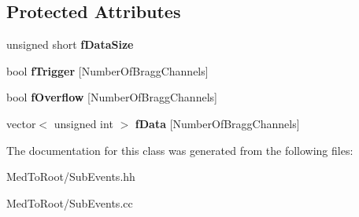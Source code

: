 \subsection*{Protected Attributes}
\begin{DoxyCompactItemize}
\item 
\hypertarget{class_bragg_chamber_sub_event_aa5205f96a716ea517af677c074367d9a}{unsigned short {\bfseries f\-Data\-Size}}\label{class_bragg_chamber_sub_event_aa5205f96a716ea517af677c074367d9a}

\item 
\hypertarget{class_bragg_chamber_sub_event_ac33e87b9327b80f85032de6076f1986e}{bool {\bfseries f\-Trigger} \mbox{[}Number\-Of\-Bragg\-Channels\mbox{]}}\label{class_bragg_chamber_sub_event_ac33e87b9327b80f85032de6076f1986e}

\item 
\hypertarget{class_bragg_chamber_sub_event_a59f31e1a784e52768d19bfd98dae16f0}{bool {\bfseries f\-Overflow} \mbox{[}Number\-Of\-Bragg\-Channels\mbox{]}}\label{class_bragg_chamber_sub_event_a59f31e1a784e52768d19bfd98dae16f0}

\item 
\hypertarget{class_bragg_chamber_sub_event_a12a0e9050a32c41872751696a6c4606e}{vector$<$ unsigned int $>$ {\bfseries f\-Data} \mbox{[}Number\-Of\-Bragg\-Channels\mbox{]}}\label{class_bragg_chamber_sub_event_a12a0e9050a32c41872751696a6c4606e}

\end{DoxyCompactItemize}


The documentation for this class was generated from the following files\-:\begin{DoxyCompactItemize}
\item 
Med\-To\-Root/Sub\-Events.\-hh\item 
Med\-To\-Root/Sub\-Events.\-cc\end{DoxyCompactItemize}
